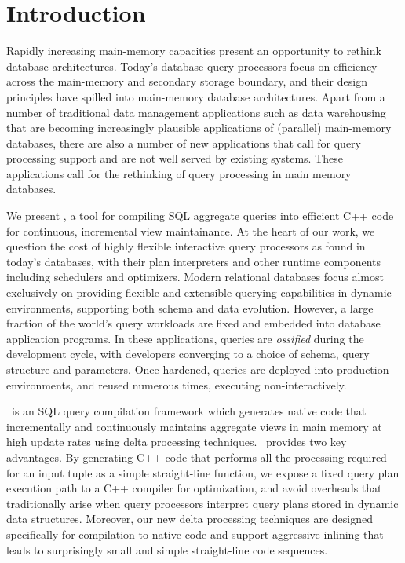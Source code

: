 \section{Introduction}

Rapidly increasing main-memory capacities present an opportunity to rethink
database architectures. Today's database query processors focus on efficiency
across the main-memory and secondary storage boundary, and their design
principles have spilled into main-memory database architectures. Apart from a
number of traditional data management applications such as data warehousing that
are becoming increasingly plausible applications of (parallel) main-memory
databases, there are also a number of new applications that call for query
processing support and are not well served by existing systems. These
applications call for the rethinking of query processing in main memory
databases.

We present \compiler, a tool for compiling SQL aggregate queries into efficient
C++ code for continuous, incremental view maintainance.
%
At the heart of our work, we question the cost of highly flexible interactive
query processors as found in today's databases, with their plan interpreters and
other runtime components including schedulers and optimizers. Modern relational
databases focus almost exclusively on providing flexible and extensible querying
capabilities in dynamic environments, supporting both schema and data evolution.
%
However, a large fraction of the world's query workloads are fixed and embedded
into database application programs. In these applications, queries are
\textit{ossified} during the development cycle, with developers converging to a
choice of schema, query structure and parameters. Once hardened, queries are
deployed into production environments, and re\-used numerous times, executing
non-interactively.




\compiler\ is an SQL query  compilation framework  which generates native code
that incrementally  and continuously maintains aggregate views in main memory
at high update rates using delta processing techniques. \compiler\ provides
two key advantages.
%
By generating C++  code that  performs all the  processing required  for an
input  tuple as  a simple  straight-line function,  we expose  a fixed
query plan execution path to  a C++ compiler for optimization, and avoid
overheads that traditionally arise when query processors interpret
query plans stored in dynamic data structures.
%
Moreover, our new delta processing techniques are designed specifically for
compilation to native code and support aggressive inlining that leads to
surprisingly small and simple straight-line code sequences.

